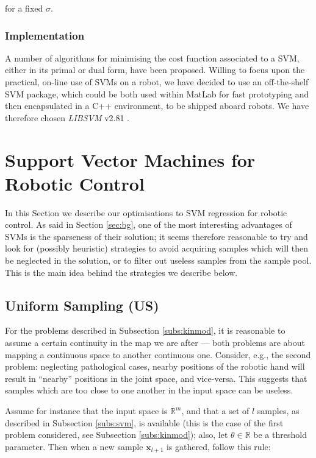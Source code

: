\documentclass[conference]{IEEEtran}
\def\RR{\mathbb{R}}
\def\xx{\mathbf{x}}
\begin{document}
\noindent for a fixed $\sigma$.

\subsubsection{Implementation}

A number of algorithms for minimising the cost function associated to
a SVM, either in its primal or dual form, have been proposed. Willing
to focus upon the practical, on-line use of SVMs on a robot, we have
decided to use an off-the-shelf SVM package, which could be both used
within MatLab for fast prototyping and then encapsulated in a C++
environment, to be shipped aboard robots. We have therefore chosen
\emph{LIBSVM} v2.81 \cite{ChangL01}.

\section{Support Vector Machines for Robotic Control}
\label{sec:opt}

In this Section we describe our optimisations to SVM regression for
robotic control. As said in Section \ref{sec:bg}, one of the most
interesting advantages of SVMs is the sparseness of their solution; it
seems therefore reasonable to try and look for (possibly heuristic)
strategies to avoid acquiring samples which will then be neglected in
the solution, or to filter out useless samples from the sample
pool. This is the main idea behind the strategies we describe below.

\subsection{Uniform Sampling (US)}

For the problems described in Subsection \ref{subs:kinmod}, it is
reasonable to assume a certain continuity in the map we are after ---
both problems are about mapping a continuous space to another
continuous one. Consider, e.g., the second problem: neglecting
pathological cases, nearby positions of the robotic hand will result
in ``nearby'' positions in the joint space, and vice-versa. This
suggests that samples which are too close to one another in the input
space can be useless.

Assume for instance that the input space is $\RR^m$, and that a set of
$l$ samples, as described in Subsection \ref{subs:svm}, is available
(this is the case of the first problem considered, see Subsection
\ref{subs:kinmod}); also, let $\theta \in \RR$ be a threshold
parameter. Then when a new sample $\xx_{l+1}$ is gathered, follow this
rule:
\end{document}
